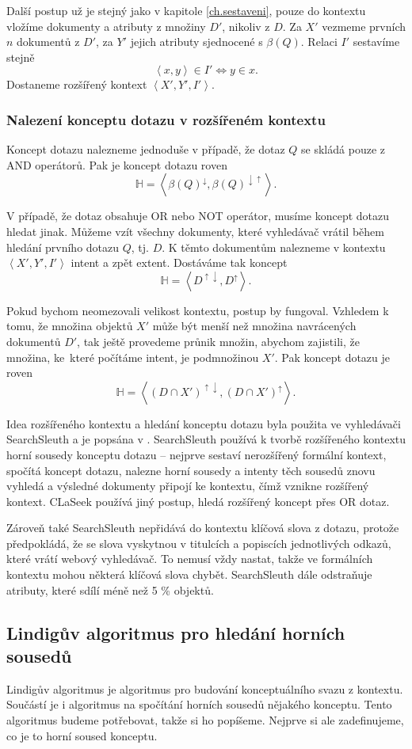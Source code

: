 \documentclass{article}
\newcommand{\name}{CLaSeek}
\newcommand{\sssection}[1]{\subsubsection{#1}}
\newcommand{\addsp}[1]{\left<#1\right>}
\newcommand{\up}{^{\uparrow}}
\newcommand{\down}{^{\downarrow}}
\newcommand{\updown}{^{\uparrow\downarrow}}
\newcommand{\downup}{^{\downarrow\uparrow}}
\newcommand{\hledany}{\mathbb{H}}
\begin{document}
Další postup už je stejný jako v kapitole \ref{ch.sestaveni}, pouze do kontextu vložíme dokumenty a atributy z množiny $D'$, nikoliv z $D$. Za $X'$ vezmeme prvních $n$ dokumentů z $D'$, za $Y'$ jejich atributy sjednocené s $\beta(Q)$. Relaci $I'$ sestavíme stejně
$$
\addsp{x,y} \in I' \iff y \in x.
$$
Dostaneme rozšířený kontext $\addsp{X', Y', I'}$. 

\sssection{Nalezení konceptu dotazu v rozšířeném kontextu}
Koncept dotazu nalezneme jednoduše v případě, že dotaz $Q$ se skládá pouze z AND operátorů. Pak je koncept dotazu roven
$$
\hledany=\addsp{\beta(Q)\down, \beta(Q)\downup}.
$$

V případě, že dotaz obsahuje OR nebo NOT operátor, musíme koncept dotazu hledat jinak. Můžeme vzít všechny dokumenty, které vyhledávač vrátil během hledání prvního dotazu $Q$, tj. $D$. K těmto dokumentům nalezneme v kontextu $\addsp{X', Y', I'}$ intent a zpět extent. Dostáváme tak koncept
$$
\hledany=\addsp{D\updown, D\up}.
$$

Pokud bychom neomezovali velikost kontextu, postup by fungoval. Vzhledem k tomu, že množina objektů $X'$ může být menší než množina navrácených dokumentů $D'$, tak ještě provedeme průnik množin, abychom zajistili, že množina, ke~které počítáme intent, je podmnožinou $X'$. Pak koncept dotazu je roven
$$
\hledany=\addsp{(D\cap X')\updown, (D\cap X')\up}.
$$

Idea rozšířeného kontextu a hledání konceptu dotazu byla použita ve vyhledávači SearchSleuth a je popsána v \cite{searchsleuth}. Search\-Sleuth používá k tvorbě rozšířeného kontextu horní sousedy konceptu dotazu -- nejprve sestaví nerozšířený formální kontext, spočítá koncept dotazu, nalezne horní sousedy a intenty těch sousedů znovu vyhledá a výsledné dokumenty připojí ke kontextu, čímž vznikne rozšířený kontext. \name{} používá jiný postup, hledá rozšířený koncept přes OR dotaz. 

Zároveň také SearchSleuth nepřidává do kontextu klíčová slova z dotazu, protože předpokládá, že se slova vyskytnou v titulcích a popiscích jednotlivých odkazů, které vrátí webový vyhledávač. To nemusí vždy nastat, takže ve formálních kontextu mohou některá klíčová slova chybět. SearchSleuth dále odstraňuje atributy, které sdílí méně než 5 \% objektů. 
 

\subsection{Lindigův algoritmus pro hledání horních sousedů}
Lindigův algoritmus je algoritmus pro budování konceptuálního svazu z kontextu. Součástí je i algoritmus na spočítání horních sousedů nějakého konceptu. Tento algoritmus budeme potřebovat, takže si ho popíšeme. Nejprve si ale zadefinujeme, co je to horní soused konceptu. 
\end{document}
